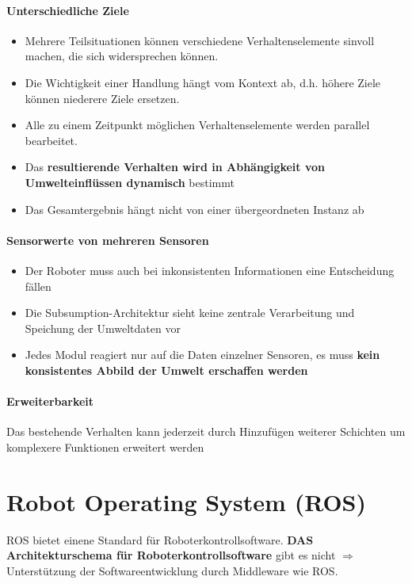 \paragraph{Unterschiedliche Ziele}
\begin{itemize}
	\item Mehrere Teilsituationen können verschiedene Verhaltenselemente sinvoll
		machen, die sich widersprechen können.
	\item Die Wichtigkeit einer Handlung hängt vom Kontext ab, d.h. höhere Ziele
		können niederere Ziele ersetzen.
	\item Alle zu einem Zeitpunkt möglichen Verhaltenselemente werden parallel
		bearbeitet.
	\item Das \textbf{resultierende Verhalten wird in Abhängigkeit von
		Umwelteinflüssen dynamisch} bestimmt
	\item Das Gesamtergebnis hängt nicht von einer übergeordneten Instanz ab
\end{itemize}

\paragraph{Sensorwerte von mehreren Sensoren}
\begin{itemize}
	\item Der Roboter muss auch bei inkonsistenten Informationen eine
		Entscheidung fällen
	\item Die Subsumption-Architektur sieht keine zentrale Verarbeitung und
		Speichung der Umweltdaten vor
	\item Jedes Modul reagiert nur auf die Daten einzelner Sensoren, es muss
		\textbf{kein konsistentes Abbild der Umwelt erschaffen werden}
\end{itemize}

\paragraph{Erweiterbarkeit} Das bestehende Verhalten kann jederzeit durch
Hinzufügen weiterer Schichten um komplexere Funktionen erweitert werden

\section{Robot Operating System (ROS)}
ROS bietet einene Standard für Roboterkontrollsoftware. \textbf{DAS
Architekturschema für Roboter\-kontrollsoftware} gibt es nicht $\Rightarrow$
Unterstützung der Softwareentwicklung durch Middleware wie ROS.

